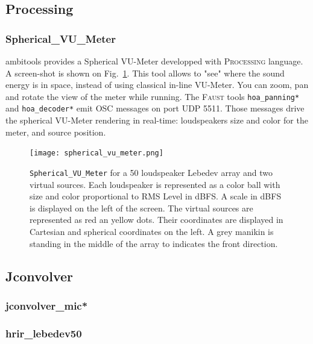 \documentclass[10pt,a4paper]{article}
\begin{document}
\pagebreak
\subsection{Processing}
\subsubsection{Spherical\_VU\_Meter}
\label{sec:processing}
ambitools provides a Spherical VU-Meter developped with \textsc{Processing} language. A screen-shot is shown on Fig.~\ref{fig:spherical_vu_meter}. This tool allows to "see" where the sound energy is in space, instead of using classical in-line VU-Meter. You can zoom, pan and rotate the view of the meter while running. The \textsc{Faust} tools \lstinline'hoa_panning*' and \lstinline'hoa_decoder*' emit \textsc{OSC} messages on port UDP 5511. Those messages drive the spherical VU-Meter rendering in real-time: loudspeakers size and color for the meter, and source position.
\begin{figure}[!ht]
\centering
\texttt{[image: spherical\_vu\_meter.png]}
\caption{\lstinline'Spherical_VU_Meter' for a 50 loudspeaker Lebedev array and two virtual sources. Each loudspeaker is represented as a color ball with size and color proportional to RMS Level in dBFS. A scale in dBFS is displayed on the left of the screen. The virtual sources are represented as red an yellow dots. Their coordinates are displayed in Cartesian and spherical coordinates on the left. A grey manikin is standing in the middle of the array to indicates the front direction.}
\label{fig:spherical_vu_meter}
\end{figure}

\pagebreak
\subsection{Jconvolver}
\subsubsection{jconvolver\_mic*}
\subsubsection{hrir\_lebedev50}


\end{document}

